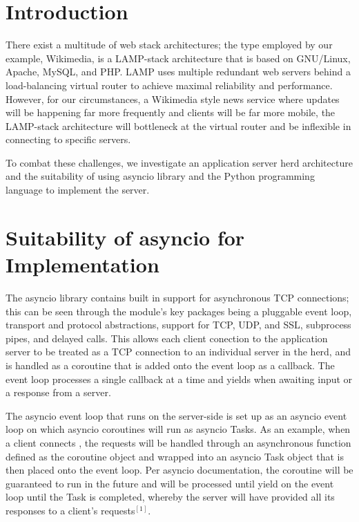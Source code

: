 \section{Introduction}

There exist a multitude of web stack architectures; the type employed by our example, Wikimedia, is a LAMP-stack architecture that is based on GNU/Linux, Apache, MySQL, and PHP. LAMP uses multiple redundant web servers behind a load-balancing virtual  router to achieve maximal reliability and performance. However, for our circumstances, a Wikimedia style news service where updates will be happening far more frequently and clients will be far more mobile, the LAMP-stack architecture will bottleneck at the virtual router and be inflexible in connecting to specific servers.

To combat these challenges, we investigate an application server herd architecture and the suitability of using asyncio library and the Python programming language to implement the server. 

\section{Suitability of asyncio for Implementation}

The asyncio library contains built in support for asynchronous TCP connections; this can be seen through the module's key packages being a pluggable event loop, transport and protocol abstractions, support for TCP, UDP, and SSL, subprocess pipes, and delayed calls. This allows each client conection to the application server to be treated as a TCP connection to an individual server in the herd, and is handled as a coroutine that is added onto the event loop as a callback. The event loop processes a single callback at a time and yields when awaiting input or a response from a server.

The asyncio event loop that runs on the server-side is set up as an asyncio event loop on which asyncio coroutines will run as asyncio Tasks. As an example, when a client connects , the requests will be handled through an asynchronous function defined as the coroutine object and wrapped into an asyncio Task object that is then placed onto the event loop. Per asyncio documentation, the coroutine will be guaranteed to run in the future and will be processed until yield on the event loop until the Task is completed, whereby the server will have provided all its responses to a client's requests$^{[1]}$.

